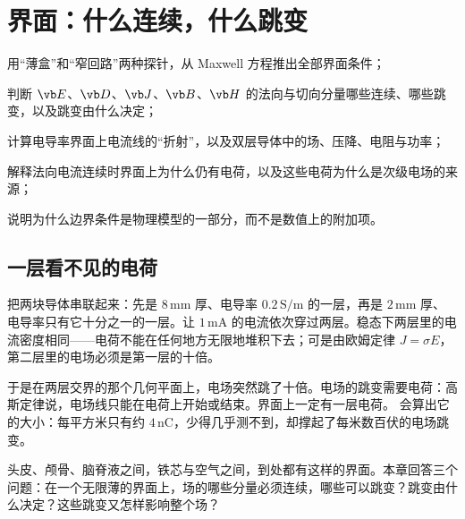 \chapter{界面：什么连续，什么跳变}\label{ch:interfaces}

\begin{chapterguide}
\begin{guidegoals}
\item 用“薄盒”和“窄回路”两种探针，从 Maxwell 方程推出全部界面条件；
\item 判断 $\vb E$、$\vb D$、$\vb J$、$\vb B$、$\vb H$ 的法向与切向分量哪些连续、哪些跳变，以及跳变由什么决定；
\item 计算电导率界面上电流线的“折射”，以及双层导体中的场、压降、电阻与功率；
\item 解释法向电流连续时界面上为什么仍有电荷，以及这些电荷为什么是次级电场的来源；
\item 说明为什么边界条件是物理模型的一部分，而不是数值上的附加项。
\end{guidegoals}
\end{chapterguide}

\section{一层看不见的电荷}\label{sec:interfaces-puzzle}

把两块导体串联起来：先是 $8\,\mathrm{mm}$ 厚、电导率 $0.2\,\mathrm{S/m}$ 的一层，再是 $2\,\mathrm{mm}$ 厚、电导率只有它十分之一的一层。让 $1\,\mathrm{mA}$ 的电流依次穿过两层。稳态下两层里的电流密度相同——电荷不能在任何地方无限地堆积下去；可是由欧姆定律 $J=\sigma E$，第二层里的电场必须是第一层的十倍。

于是在两层交界的那个几何平面上，电场突然跳了十倍。电场的跳变需要电荷：高斯定律说，电场线只能在电荷上开始或结束。界面上一定有一层电荷。 会算出它的大小：每平方米只有约 $4\,\mathrm{nC}$，少得几乎测不到，却撑起了每米数百伏的电场跳变。

头皮、颅骨、脑脊液之间，铁芯与空气之间，到处都有这样的界面。本章回答三个问题：在一个无限薄的界面上，场的哪些分量必须连续，哪些可以跳变？跳变由什么决定？这些跳变又怎样影响整个场？

